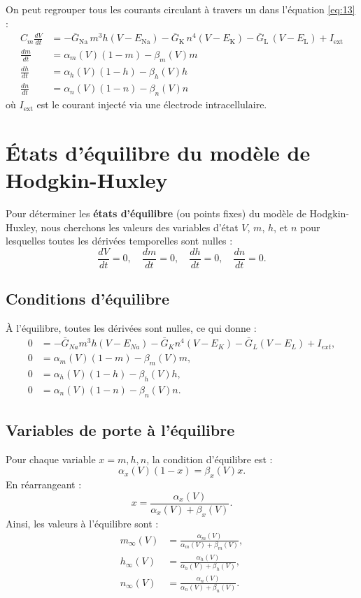 On peut regrouper tous les courants circulant à travers un dans l'équation \eqref{eq:13} :
\begin{align}
	C_m \frac{dV}{dt} &= -\bar{G}_{\text{Na}}\, m^3 h (V - E_{\text{Na}})
	-\bar{G}_{\text{K}}\, n^4 (V - E_{\text{K}})
	-\bar{G}_{\text{L}}\, (V - E_{\text{L}})
	+ I_{\text{ext}} 
	\label{eq:13} \\
	\frac{dm}{dt} &= \alpha_m(V)(1 - m) - \beta_m(V) m \label{eq:14}\\
	\frac{dh}{dt} &= \alpha_h(V)(1 - h) - \beta_h(V) h \label{eq:15}\\
	\frac{dn}{dt} &= \alpha_n(V)(1 - n) - \beta_n(V) n \label{eq:16}
\end{align}
où $I_{\text{ext}}$ est le courant injecté via une électrode intracellulaire.

\section{États d'équilibre du modèle de Hodgkin-Huxley}

Pour déterminer les \textbf{états d'équilibre} (ou points fixes) du modèle de Hodgkin-Huxley, nous cherchons les valeurs des variables d'état \( V \), \( m \), \( h \), et \( n \) pour lesquelles toutes les dérivées temporelles sont nulles :
\[
\frac{dV}{dt} = 0, \quad \frac{dm}{dt} = 0, \quad \frac{dh}{dt} = 0, \quad \frac{dn}{dt} = 0.
\]
\subsection{Conditions d'équilibre}
À l'équilibre, toutes les dérivées sont nulles, ce qui donne :
\begin{align*}
	0 &= -\bar{G}_{Na} m^3 h (V - E_{Na}) - \bar{G}_K n^4 (V - E_K) - \bar{G}_L (V - E_L) + I_{ext}, \\
	0 &= \alpha_m(V) (1 - m) - \beta_m(V) m, \\
	0 &= \alpha_h(V) (1 - h) - \beta_h(V) h, \\
	0 &= \alpha_n(V) (1 - n) - \beta_n(V) n.
\end{align*}

\subsection{Variables de porte à l'équilibre}
Pour chaque variable \( x = m, h, n \), la condition d'équilibre est :
\[
\alpha_x(V) (1 - x) = \beta_x(V) x.
\]
En réarrangeant :
\[
x = \frac{\alpha_x(V)}{\alpha_x(V) + \beta_x(V)}.
\]
Ainsi, les valeurs à l'équilibre sont :
\begin{align*}
	m_\infty(V) &= \frac{\alpha_m(V)}{\alpha_m(V) + \beta_m(V)}, \\
	h_\infty(V) &= \frac{\alpha_h(V)}{\alpha_h(V) + \beta_h(V)}, \\
	n_\infty(V) &= \frac{\alpha_n(V)}{\alpha_n(V) + \beta_n(V)}.
\end{align*}

